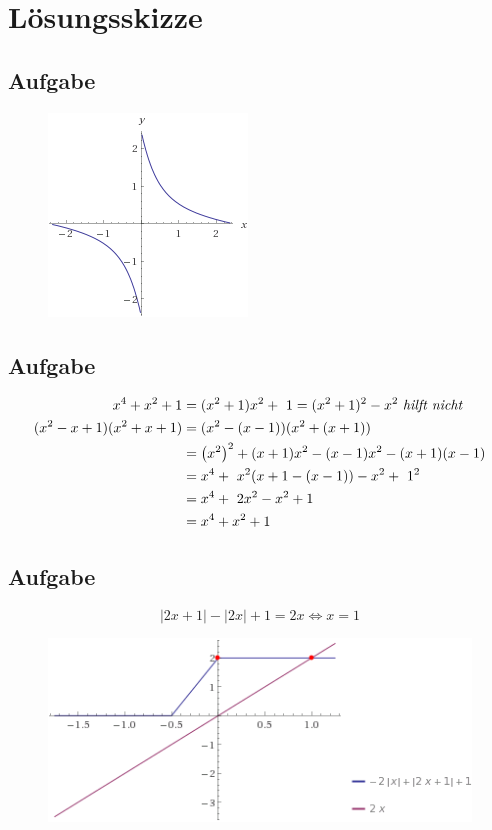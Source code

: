 \documentclass[a4paper,10pt]{article}
\begin{document}
\section{Lösungsskizze}

\subsection{Aufgabe} %
\begin{figure}[h!]
	\centering
	\includegraphics[width=.3\linewidth]{res/KL161-1.png}
\end{figure}

\subsection{Aufgabe} %
\begin{align*}
x^4+x^2+1 &= (x^2+1)x^2 + 1 = (x^2 + 1)^2 - x^2\text{ \textit{hilft nicht}} \\
(x^2-x+1)(x^2+x+1) &= (x^2-(x-1))(x^2+(x+1)) \\
&= \left(x^2\right)^2 + (x+1)x^2 - (x-1)x^2 - (x+1)(x-1) \\
&= x^4 + x^2 (x+1-(x-1)) - x^2 + 1^2 \\
&= x^4 + 2x^2 - x^2 + 1 \\
&= x^4 + x^2 + 1
\end{align*}

\subsection{Aufgabe} %
\[|2x + 1| - |2x| + 1 = 2x \Leftrightarrow x=1\]
\begin{figure}[H]
	\centering
	\includegraphics[width=.5\linewidth]{res/KL161-3.png}
\end{figure}
\end{document}
